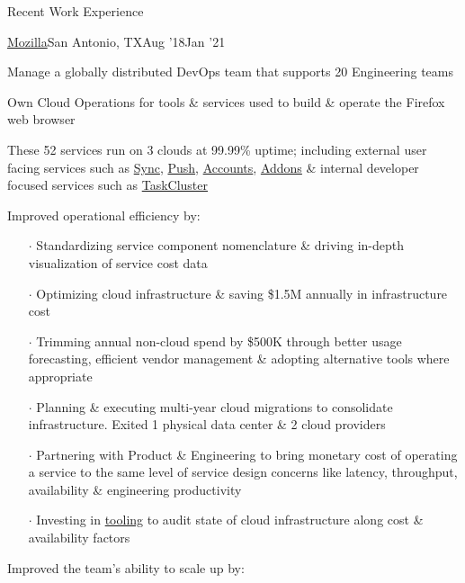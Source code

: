 \documentclass{resume} %
\begin{document}
\begin{rSection}{Recent Work Experience}
\begin{rSubsection}{\href{https://www.mozilla.org/}{Mozilla}}{San Antonio, TX}{Aug '18}{Jan '21}
\item Manage a globally distributed DevOps team that supports 20 Engineering teams
\item Own Cloud Operations for tools \& services used to build \& operate the Firefox web browser
\item These 52 services run on 3 clouds at 99.99\% uptime; including external user facing services such as \href{https://github.com/mozilla-services/syncstorage-rs}{Sync}, \href{https://github.com/mozilla-services/autopush-rs}{Push}, \href{https://github.com/mozilla/fxa}{Accounts}, \href{https://github.com/mozilla/addons}{Addons} \& internal developer focused services such as \href{https://github.com/taskcluster}{TaskCluster}
  \item Improved operational efficiency by:
  \vspace{-0.5em}
    \begin{itemize} \itemsep0.5pt \parskip0pt
    \item[$\cdot$] Standardizing service component nomenclature \& driving in-depth visualization of service cost data
    \item[$\cdot$] Optimizing cloud infrastructure \& saving \$1.5M annually in infrastructure cost
    \item[$\cdot$] Trimming annual non-cloud spend by \$500K through better usage forecasting, efficient vendor management \& adopting alternative tools where appropriate
    \item[$\cdot$] Planning \& executing multi-year cloud migrations to consolidate infrastructure. Exited 1 physical data center \& 2 cloud providers
    \item[$\cdot$] Partnering with Product \& Engineering to bring monetary cost of operating a service to the same level of service design concerns like latency, throughput, availability \& engineering productivity
    \item[$\cdot$] Investing in \href{https://github.com/mozilla/frost}{tooling} to audit state of cloud infrastructure along cost \& availability factors
    \end{itemize}
  \item Improved the team's ability to scale up by:
     \vspace{-0.5em}
    \begin{itemize} \itemsep0.5pt \parskip0pt 

\end{itemize}
\end{rSubsection}
\end{rSection}
\end{document}
